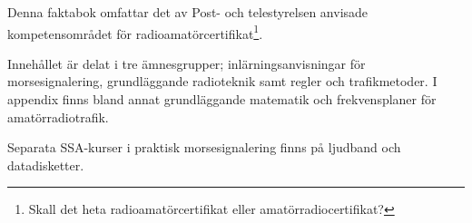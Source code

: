 \onecolumn
\begin{rev-omarbetas}
Denna faktabok omfattar det av Post- och telestyrelsen anvisade
kompetensområdet för radioamatörcertifikat\footnote{Skall det heta 
radioamatörcertifikat eller amatörradiocertifikat?}.

Innehållet är delat i tre ämnesgrupper; inlärningsanvisningar för
morsesignalering, grundläggande radioteknik samt regler och
trafikmetoder. I appendix finns bland annat grundläggande matematik
och frekvensplaner för amatörradiotrafik.

Separata SSA-kurser i praktisk morsesignalering finns på ljudband och
datadisketter.
\end{rev-omarbetas}

\twocolumn
